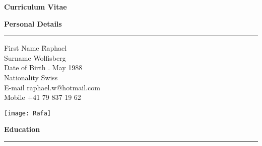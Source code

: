 



\graphicspath{{./Pictures/}}


\newpage
\pagestyle{plain}
\vspace{-9cm}

\huge
\textbf{Curriculum Vitae}

\bigskip
\bigskip
\Large
\textbf{Personal Details}
\noindent\rule[0mm]{\linewidth}{2pt}

\normalsize
\begin{tabbing}
First Name \hspace*{2.4cm} \= Raphael \\
Surname \> Wolfisberg \\
Date of Birth . May 1988 \\
Nationality \> Swiss \\
\medskip
E-mail \> raphael.w@hotmail.com \\
Mobile \> +41 79 837 19 62 
\end{tabbing}

\begin{addmargin}{0.03\textwidth}
\vspace{-4.4cm}
\begin{flushright}
\texttt{[image: Rafa]} \\[1cm]
\end{flushright}
\end{addmargin}

\vspace{-1cm}
\Large
\textbf{Education}
\noindent\rule[0mm]{\linewidth}{2pt}

